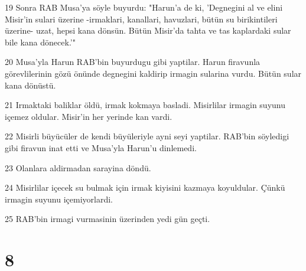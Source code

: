 \par 19 Sonra RAB Musa'ya söyle buyurdu: "Harun'a de ki, 'Degnegini al ve elini Misir'in sulari üzerine -irmaklari, kanallari, havuzlari, bütün su birikintileri üzerine- uzat, hepsi kana dönsün. Bütün Misir'da tahta ve tas kaplardaki sular bile kana dönecek.'"
\par 20 Musa'yla Harun RAB'bin buyurdugu gibi yaptilar. Harun firavunla görevlilerinin gözü önünde degnegini kaldirip irmagin sularina vurdu. Bütün sular kana dönüstü.
\par 21 Irmaktaki baliklar öldü, irmak kokmaya basladi. Misirlilar irmagin suyunu içemez oldular. Misir'in her yerinde kan vardi.
\par 22 Misirli büyücüler de kendi büyüleriyle ayni seyi yaptilar. RAB'bin söyledigi gibi firavun inat etti ve Musa'yla Harun'u dinlemedi.
\par 23 Olanlara aldirmadan sarayina döndü.
\par 24 Misirlilar içecek su bulmak için irmak kiyisini kazmaya koyuldular. Çünkü irmagin suyunu içemiyorlardi.
\par 25 RAB'bin irmagi vurmasinin üzerinden yedi gün geçti.

\chapter{8}

